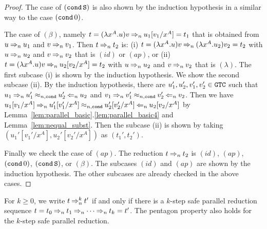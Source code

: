 \begin{proof}
  The case of $({\tt cond}\,{\tt S})$ is also shown by the induction hypothesis in a similar way to the case $({\tt cond}\,0)$.

  The case of $(\beta)$, namely $t = (\lambda x^A.u)v \mathbin{\Rightarrow_{n}} u_1[v_1/x^A] = t_1$ that is 
  obtained from $u \mathbin{\Rightarrow_{n}} u_1$ and $v \mathbin{\Rightarrow_{n}} v_1$.
  Then $t \mathbin{\Rightarrow_{n}} t_2$ is: 
  (i) $t=(\lambda x^A.u)v \mathbin{\Rightarrow_{n}} (\lambda x^A.u_2)v_2 = t_2$
  with $u \mathbin{\Rightarrow_{n}} u_2$ and $v \mathbin{\Rightarrow_{n}} v_2$ that is $(id)$ or $(ap)$, or
  (ii) $t=(\lambda x^A.u)v \mathbin{\Rightarrow_{n}} u_2[v_2/x^A]=t_2$
  with $u \mathbin{\Rightarrow_{n}} u_2$ and $v \mathbin{\Rightarrow_{n}} v_2$ that is $(\lambda)$.
  The first subcase (i) is shown by the induction hypothesis.
  We show the second subcase (ii).
  By the induction hypothesis, there are $u_1', u_2',v_1',v_2' \in {\tt GTC}$ such that  
  $u_1 \mathbin{\Rightarrow_{n}} u_1' \mathbin{\approx_{n,{\tt cond}}} u_2' \mathbin{\Leftarrow_{n}} u_2$ and
  $v_1 \mathbin{\Rightarrow_{n}} v_1' \mathbin{\approx_{n,{\tt cond}}} v_2' \mathbin{\Leftarrow_{n}} v_2$.
  Then we have $u_1[v_1/x^A] \mathbin{\Rightarrow_{n}} u_1'[v_1'/x^A] \mathbin{\approx_{n,{\tt cond}}} u_2'[v_2'/x^A] \mathbin{\Leftarrow_{n}} u_2[v_2/x^A]$ by Lemma~\ref{lem:parallel_basic}.\ref{lem:parallel_basic4} and Lemma~\ref{lem:nequal_subst}. 
  Then the subcase (ii) is shown by taking $(u_1'[v_1'/x^A],u_2'[v_2'/x^A])$ as $(t_1',t_2')$. 
  
  Finally we check the case of $(ap)$.
  The reduction $t \mathbin{\Rightarrow_{n}} t_2$ is $(id)$, $(ap)$, $({\tt cond}\,0)$, $({\tt cond}\,{\tt S})$, or $(\beta)$.
  The subcases $(id)$ and $(ap)$ are shown by the induction hypothesis.
  The other subcases are already checked in the above cases. 
\end{proof}

For $k\ge 0$, we write $t \mathbin{\Rightarrow_{n}^{k}} t'$ if and only if
there is a $k$-step safe parallel reduction sequence
$t=t_0 \mathbin{\Rightarrow_{n}} t_1 \mathbin{\Rightarrow_{n}} \cdots \mathbin{\Rightarrow_{n}} t_k = t'$. 
The pentagon property also holds for the $k$-step safe parallel reduction. 

